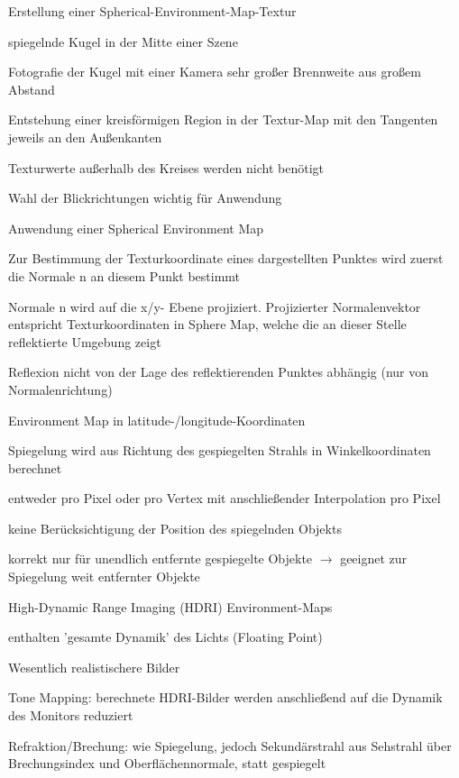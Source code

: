 \documentclass[landscape]{article}
\begin{document}
\begin{multicols}{3}
  Erstellung einer Spherical-Environment-Map-Textur
  \begin{itemize*}
    \item spiegelnde Kugel in der Mitte einer Szene
    \item Fotografie der Kugel mit einer Kamera sehr großer Brennweite aus großem Abstand
    \item Entstehung einer kreisförmigen Region in der Textur-Map mit den Tangenten jeweils an den Außenkanten
    \item Texturwerte außerhalb des Kreises werden nicht benötigt
    \item Wahl der Blickrichtungen wichtig für Anwendung
  \end{itemize*}
  
  Anwendung einer Spherical Environment Map
  \begin{itemize*}
    \item Zur Bestimmung der Texturkoordinate eines dargestellten Punktes wird zuerst die Normale n an diesem Punkt bestimmt
    \item Normale n wird auf die x/y- Ebene projiziert. Projizierter Normalenvektor entspricht Texturkoordinaten in Sphere Map, welche die an dieser Stelle reflektierte Umgebung zeigt
    \item Reflexion nicht von der Lage des reflektierenden Punktes abhängig (nur von Normalenrichtung)
  \end{itemize*}
  
  Environment Map in latitude-/longitude-Koordinaten
  \begin{itemize*}
    \item Spiegelung wird aus Richtung des gespiegelten Strahls in Winkelkoordinaten berechnet
    \item entweder pro Pixel oder pro Vertex mit anschließender Interpolation pro Pixel
    \item keine Berücksichtigung der Position des spiegelnden Objekts
    \item korrekt nur für unendlich entfernte gespiegelte Objekte $\rightarrow$ geeignet zur Spiegelung weit entfernter Objekte
  \end{itemize*}
  
  
  High-Dynamic Range Imaging (HDRI) Environment-Maps
  \begin{itemize*}
    \item enthalten 'gesamte Dynamik' des Lichts (Floating Point)
    \item Wesentlich realistischere Bilder
    \item Tone Mapping: berechnete HDRI-Bilder werden anschließend auf die Dynamik des Monitors reduziert
    \item Refraktion/Brechung: wie Spiegelung, jedoch Sekundärstrahl aus Sehstrahl über Brechungsindex und Oberflächennormale, statt gespiegelt
  \end{itemize*}
  

\end{multicols}
\end{document}
